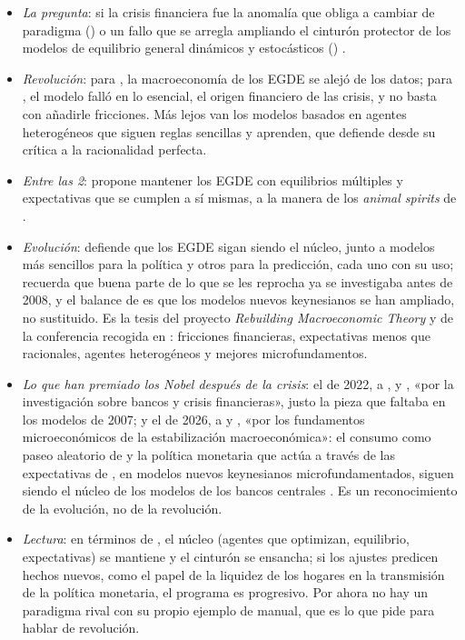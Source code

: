 \documentclass[11pt]{article}
\begin{document}
\begin{itemize}
\item \emph{La pregunta}: si la crisis financiera fue la anomalía que obliga a cambiar de paradigma () o un fallo que se arregla ampliando el cinturón protector de los modelos de equilibrio general dinámicos y estocásticos ()  .
\item \emph{Revolución}: para  \parencite*{Romer2016Trouble}, la macroeconomía de los EGDE se alejó de los datos; para \textcite{Stiglitz2018Wrong}, el modelo falló en lo esencial, el origen financiero de las crisis, y no basta con añadirle fricciones. Más lejos van los modelos basados en agentes heterogéneos que siguen reglas sencillas y aprenden, que defiende  \parencite*{Leijonhufvud2006Agent} desde su crítica a la racionalidad perfecta\nocite{Leijonhufvud1993NotTooRational}.
\item \emph{Entre las 2}:  \parencite*{Farmer2010Expectations} propone mantener los EGDE con equilibrios múltiples y expectativas que se cumplen a sí mismas, a la manera de los \emph{animal spirits} de .
\item \emph{Evolución}: \textcite{Blanchard2018Future} defiende que los EGDE sigan siendo el núcleo, junto a modelos más sencillos para la política y otros para la predicción, cada uno con su uso; \textcite{Reis2018Wrong} recuerda que buena parte de lo que se les reprocha ya se investigaba antes de 2008, y el balance de \textcite{Gali2018State} es que los modelos nuevos keynesianos se han ampliado, no sustituido. Es la tesis del proyecto \emph{Rebuilding Macroeconomic Theory}\nocite{VinesWills2018Rebuilding} y de la conferencia recogida en \textcite{BlanchardSummers2019Evolution}: fricciones financieras, expectativas menos que racionales, agentes heterogéneos y mejores microfundamentos.
\item \emph{Lo que han premiado los Nobel después de la crisis}: el de 2022, a ,  y , «por la investigación sobre bancos y crisis financieras», justo la pieza que faltaba en los modelos de 2007; y el de 2026, a  y , «por los fundamentos microeconómicos de la estabilización macroeconómica»: el consumo como paseo aleatorio de  y la política monetaria que actúa a través de las expectativas de , en modelos nuevos keynesianos microfundamentados, siguen siendo el núcleo de los modelos de los bancos centrales\nocite{Nobel2022,Nobel2026Prensa} . Es un reconocimiento de la evolución, no de la revolución.
\item \emph{Lectura}: en términos de , el núcleo (agentes que optimizan, equilibrio, expectativas) se mantiene y el cinturón se ensancha; si los ajustes predicen hechos nuevos, como el papel de la liquidez de los hogares en la transmisión de la política monetaria, el programa es progresivo. Por ahora no hay un paradigma rival con su propio ejemplo de manual, que es lo que  pide para hablar de revolución.
\end{itemize}
\end{document}
